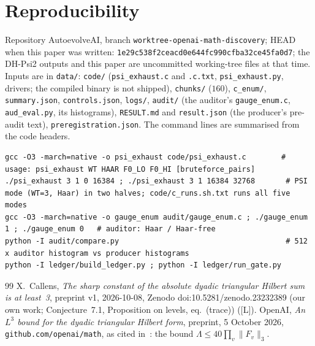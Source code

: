 \documentclass[10pt]{article}
\newcommand{\tier}[1]{\textsf{[#1]}}
\newcommand{\tL}{\tier{L}}
\begin{document}
\section{Reproducibility}\label{sec:repro}
Repository AutoevolveAI, branch \texttt{worktree-openai-math-discovery}; HEAD when this paper was written: \texttt{1e29c538f2ceacd0e644fc990cfba32ce45fa0d7}; the DH-Psi2 outputs and this paper are uncommitted working-tree files at that time. Inputs are in \texttt{data/}: \texttt{code/} (\texttt{psi\_exhaust.c} and \texttt{.c.txt}, \texttt{psi\_exhaust.py}, drivers; the compiled binary is not shipped), \texttt{chunks/} ($160$), \texttt{c\_enum/}, \texttt{summary.json}, \texttt{controls.json}, \texttt{logs/}, \texttt{audit/} (the auditor's \texttt{gauge\_enum.c}, \texttt{aud\_eval.py}, its histograms), \texttt{RESULT.md} and \texttt{result.json} (the producer's pre-audit text), \texttt{preregistration.json}. The command lines are summarised from the code headers.
\begin{lstlisting}[basicstyle=\ttfamily\scriptsize]
gcc -O3 -march=native -o psi_exhaust code/psi_exhaust.c        # usage: psi_exhaust WT HAAR F0_LO F0_HI [bruteforce_pairs]
./psi_exhaust 3 1 0 16384 ; ./psi_exhaust 3 1 16384 32768       # PSI mode (WT=3, Haar) in two halves; code/c_runs.sh.txt runs all five modes
gcc -O3 -march=native -o gauge_enum audit/gauge_enum.c ; ./gauge_enum 1 ; ./gauge_enum 0   # auditor: Haar / Haar-free
python -I audit/compare.py                                      # 512 x auditor histogram vs producer histograms
python -I ledger/build_ledger.py ; python -I ledger/run_gate.py
\end{lstlisting}

\begin{thebibliography}{99}\small
{} X.~Callens, \emph{The sharp constant of the absolute dyadic triangular Hilbert sum is at least~3}, preprint v1, 2026-10-08, Zenodo doi:10.5281/zenodo.23232389 (our own work; Conjecture~7.1, Proposition on levels, eq.~(trace)) (\tL).
 OpenAI, \emph{An $L^3$ bound for the dyadic triangular Hilbert form}, preprint, 5 October 2026, \texttt{github.com/openai/math}, as cited in~\cite{dh}: the bound $\Lambda\le40\prod_v\|F_v\|_3$.
\end{thebibliography}
\end{document}
